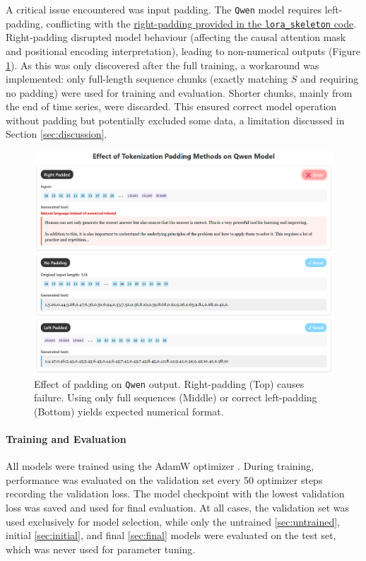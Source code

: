 \documentclass{article}
\begin{document}
A critical issue encountered was input padding. The \texttt{Qwen} model requires left-padding, conflicting with the \href{https://gitlab.developers.cam.ac.uk/phy/data-intensive-science-mphil/lecture-materials/m2_dl_for_dis/-/blob/main/coursework/lora_skeleton.py?ref_type=heads}{right-padding provided in the \texttt{lora\_skeleton} code}. Right-padding disrupted model behaviour (affecting the causal attention mask and positional encoding interpretation), leading to non-numerical outputs (Figure \ref{fig:padding_effect}). As this was only discovered after the full training, a workaround was implemented: only full-length sequence chunks (exactly matching $S$ and requiring no padding) were used for training and evaluation. Shorter chunks, mainly from the end of time series, were discarded. This ensured correct model operation without padding but potentially excluded some data, a limitation discussed in Section \ref{sec:discussion}.

\begin{figure}[!htbp]
    \centering
    \includegraphics[width=0.9\linewidth]{M2 Course Work//Images/padding_effect.png}
    \caption{Effect of padding on \texttt{Qwen} output. Right-padding (Top) causes failure. Using only full sequences (Middle) or correct left-padding (Bottom) yields expected numerical format.} %
    \label{fig:padding_effect}
\end{figure}


\paragraph{Training and Evaluation}
All models were trained using the AdamW optimizer \cite{loshchilov2019decoupledweightdecayregularization}. During training, performance was evaluated on the validation set every 50 optimizer steps recording the validation loss. The model checkpoint with the lowest validation loss was saved and used for final evaluation. At all cases, the validation set was used exclusively for model selection, while only the untrained \ref{sec:untrained}, initial \ref{sec:initial}, and final \ref{sec:final} models were evaluated on the test set, which was never used for parameter tuning.
\end{document}

